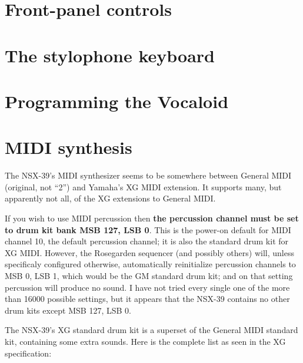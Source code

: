\documentclass[titlepage]{article}
\begin{document}
\section{Front-panel controls}

\section{The stylophone keyboard}

\section{Programming the Vocaloid}

\section{MIDI synthesis}

The NSX-39's MIDI synthesizer seems to be somewhere between General MIDI
(original, not ``2'') and Yamaha's XG MIDI extension.  It supports many, but
apparently not all, of the XG extensions to General MIDI.

If you wish to use MIDI percussion then \textbf{the percussion channel must
be set to drum kit bank MSB 127, LSB 0}.  This is the power-on default for
MIDI channel 10, the default percussion channel; it is also the standard
drum kit for XG MIDI.  However, the Rosegarden sequencer (and possibly
others) will, unless specificaly configured otherwise, automatically
reinitialize percussion channels to MSB 0, LSB 1, which would be the GM
standard drum kit; and on that setting percussion will produce no sound.  I
have not tried every single one of the more than 16000 possible settings,
but it appears that the NSX-39 contains no other drum kits except MSB 127,
LSB 0.

The NSX-39's XG standard drum kit is a superset of the General MIDI standard
kit, containing some extra sounds.  Here is the complete list as seen in the
XG specification:
\end{document}
